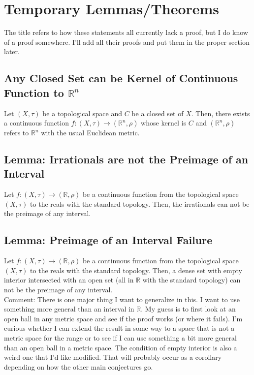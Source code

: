 \documentclass{article}
\begin{document}
\newpage
\section{Temporary Lemmas/Theorems}
The title refers to how these statements all currently lack a proof, but I do know of a proof somewhere. I'll add all their proofs and put them in the proper section later.

\subsection{Any Closed Set can be Kernel of Continuous Function to $\mathbb{R}^n$}
Let $(X,\tau)$ be a topological space and $C$ be a closed set of $X$. Then, there exists a continuous function $f: (X,\tau) \to (\mathbb{R}^n,\rho)$ whose kernel is $C$ and $(\mathbb{R}^n,\rho)$ refers to $\mathbb{R}^n$ with the usual Euclidean metric.\\


\subsection{Lemma: Irrationals are not the Preimage of an\\ Interval}
Let $f: (X,\tau) \to (\mathbb{R},\rho)$ be a continuous function from the topological space $(X,\tau)$ to the reals with the standard topology. Then, the irrationals can not be the preimage of any interval.\\


\subsection{Lemma: Preimage of an Interval Failure}
Let $f: (X,\tau) \to (\mathbb{R},\rho)$ be a continuous function from the topological space $(X,\tau)$ to the reals with the standard topology. Then, a dense set with empty interior intersected with an open set (all in $\mathbb{R}$ with the standard topology) can not be the preimage of any interval.\\

Comment: There is one major thing I want to generalize in this. I want to use something more general than an interval in $\mathbb{R}$. My guess is to first look at an open ball in any metric space and see if the proof works (or where it fails). I'm curious whether I can extend the result in some way to a space that is not a metric space for the range or to see if I can use something a bit more general than an open ball in a metric space. The condition of empty interior is also a weird one that I'd like modified. That will probably occur as a corollary depending on how the other main conjectures go.
\end{document}
